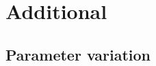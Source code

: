 
% 

% 

% 


% 

% 

\chapter{Additional}
\label{app:additional}

\section{Parameter variation}
\label{app:parameters}